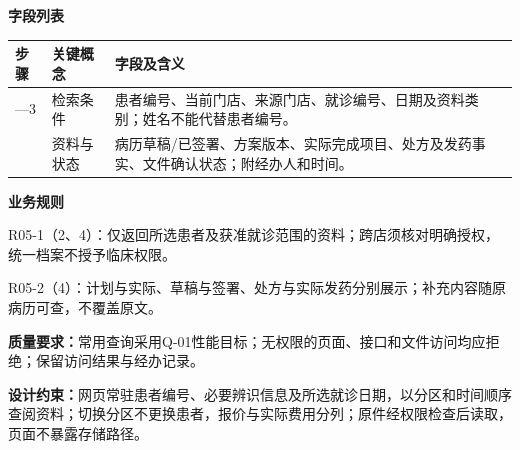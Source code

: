 \documentclass[UTF8,a4paper,zihao=-4,fontset=none]{ctexart}
\begin{document}
\noindent\textbf{字段列表}\par
{\setlength{\tabcolsep}{3pt}\renewcommand{\arraystretch}{1.04}
\noindent\begin{tabular}{@{}>{\raggedright\arraybackslash}p{1.2cm}>{\raggedright\arraybackslash}p{2.2cm}>{\raggedright\arraybackslash}p{12.3cm}@{}}
\toprule
步骤 & 关键概念 & 字段及含义 \\ \midrule
1—3 & 检索条件 & 患者编号、当前门店、来源门店、就诊编号、日期及资料类别；姓名不能代替患者编号。 \\
4 & 资料与状态 & 病历草稿/已签署、方案版本、实际完成项目、处方及发药事实、文件确认状态；附经办人和时间。 \\
\bottomrule
\end{tabular}\par}
\smallskip
\noindent\textbf{业务规则}\par
\noindent R05-1（2、4）：仅返回所选患者及获准就诊范围的资料；跨店须核对明确授权，统一档案不授予临床权限。\par
\noindent R05-2（4）：计划与实际、草稿与签署、处方与实际发药分别展示；补充内容随原病历可查，不覆盖原文。\par
\smallskip
\noindent\textbf{质量要求：}常用查询采用Q-01性能目标；无权限的页面、接口和文件访问均应拒绝；保留访问结果与经办记录。\par
\noindent\textbf{设计约束：}网页常驻患者编号、必要辨识信息及所选就诊日期，以分区和时间顺序查阅资料；切换分区不更换患者，报价与实际费用分列；原件经权限检查后读取，页面不暴露存储路径。\par
\endgroup
\clearpage
\end{document}
